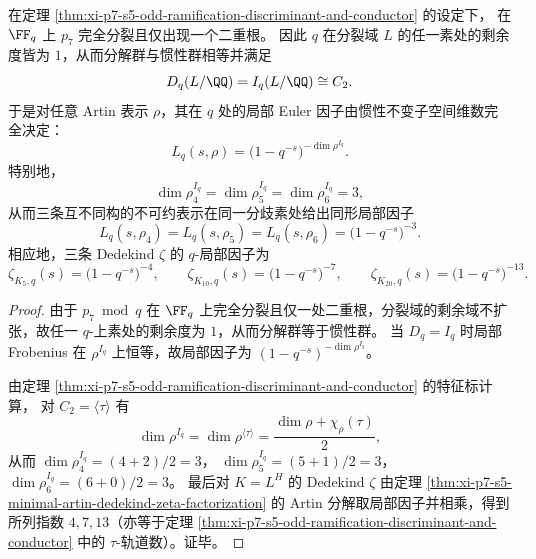\begin{theorem}\label{thm:xi-p7-s5-local-euler-factor-triple-isomorphism-at-q}
在定理 \ref{thm:xi-p7-s5-odd-ramification-discriminant-and-conductor} 的设定下，
在 \(\FF_q\) 上 \(p_7\) 完全分裂且仅出现一个二重根。
因此 \(q\) 在分裂域 \(L\) 的任一素处的剩余度皆为 \(1\)，从而分解群与惯性群相等并满足
\[
D_q(L/\QQ)=I_q(L/\QQ)\cong C_2.
\]
于是对任意 Artin 表示 \(\rho\)，其在 \(q\) 处的局部 Euler 因子由惯性不变子空间维数完全决定：
\[
L_q(s,\rho)=\bigl(1-q^{-s}\bigr)^{-\dim \rho^{I_q}}.
\]
特别地，
\[
\dim \rho_4^{I_q}=\dim \rho_5^{I_q}=\dim \rho_6^{I_q}=3,
\]
从而三条互不同构的不可约表示在同一分歧素处给出同形局部因子
\[
L_q(s,\rho_4)=L_q(s,\rho_5)=L_q(s,\rho_6)=\bigl(1-q^{-s}\bigr)^{-3}.
\]
相应地，三条 Dedekind \(\zeta\) 的 \(q\)-局部因子为
\[
\zeta_{K_5,q}(s)=\bigl(1-q^{-s}\bigr)^{-4},\qquad
\zeta_{K_{10},q}(s)=\bigl(1-q^{-s}\bigr)^{-7},\qquad
\zeta_{K_{20},q}(s)=\bigl(1-q^{-s}\bigr)^{-13}.
\]
\end{theorem}
\begin{proof}
由于 \(p_7\bmod q\) 在 \(\FF_q\) 上完全分裂且仅一处二重根，分裂域的剩余域不扩张，故任一 \(q\)-上素处的剩余度为 \(1\)，从而分解群等于惯性群。
当 \(D_q=I_q\) 时局部 Frobenius 在 \(\rho^{I_q}\) 上恒等，故局部因子为 \((1-q^{-s})^{-\dim\rho^{I_q}}\)。
\par
由定理 \ref{thm:xi-p7-s5-odd-ramification-discriminant-and-conductor} 的特征标计算，
对 \(C_2=\langle\tau\rangle\) 有
\[
\dim\rho^{I_q}=\dim\rho^{\langle\tau\rangle}=\frac{\dim\rho+\chi_\rho(\tau)}{2},
\]
从而
\(
\dim\rho_4^{I_q}=(4+2)/2=3
\)，
\(
\dim\rho_5^{I_q}=(5+1)/2=3
\)，
\(
\dim\rho_6^{I_q}=(6+0)/2=3
\)。
最后对 \(K=L^H\) 的 Dedekind \(\zeta\) 由定理 \ref{thm:xi-p7-s5-minimal-artin-dedekind-zeta-factorization} 的 Artin 分解取局部因子并相乘，得到所列指数 \(4,7,13\)（亦等于定理 \ref{thm:xi-p7-s5-odd-ramification-discriminant-and-conductor} 中的 \(\tau\)-轨道数）。证毕。
\end{proof}

